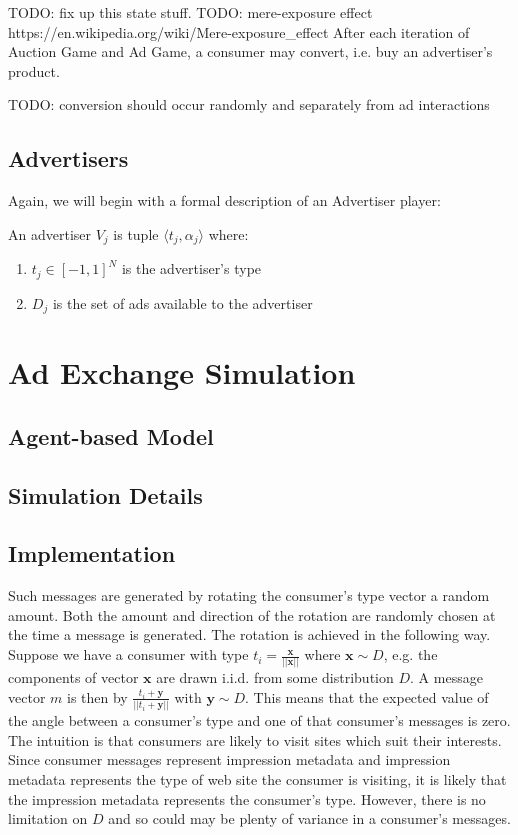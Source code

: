 \documentclass{article}
\begin{document}
TODO: fix up this state stuff.
TODO: mere-exposure effect https://en.wikipedia.org/wiki/Mere-exposure\_effect
After each iteration of Auction Game and Ad Game, a consumer may convert, i.e. buy an advertiser's product.

TODO: conversion should occur randomly and separately from ad interactions

\subsection{Advertisers}

Again, we will begin with a formal description of an Advertiser player:

An advertiser $V_j$ is tuple $\langle t_j, \alpha_j \rangle$ where:

\begin{enumerate}
	\item $t_j \in [-1,1]^N$ is the advertiser's type
	\item $D_j$ is the set of ads available to the advertiser
\end{enumerate}

\newpage

\section{Ad Exchange Simulation}

\subsection{Agent-based Model}

\subsection{Simulation Details}

\subsection{Implementation}

Such messages are generated by rotating the consumer's type vector a random amount. Both the amount and direction of the rotation are randomly chosen at the time a message is generated. The rotation is achieved in the following way. Suppose we have a consumer with type $t_i = \frac{\bm{x}}{||\bm{x}||}$ where $\bm{x} \sim D$, e.g. the components of vector $\bm{x}$ are drawn i.i.d. from some distribution $D$. A message vector $m$ is then by $\frac{t_i + \bm{y}}{||t_i + \bm{y}||}$ with $\bm{y} \sim D$. This means that the expected value of the angle between a consumer's type and one of that consumer's messages is zero. The intuition is that consumers are likely to visit sites which suit their interests. Since consumer messages represent impression metadata and impression metadata represents the type of web site the consumer is visiting, it is likely that the impression metadata represents the consumer's type. However, there is no limitation on $D$ and so could may be plenty of variance in a consumer's messages.
\end{document}
